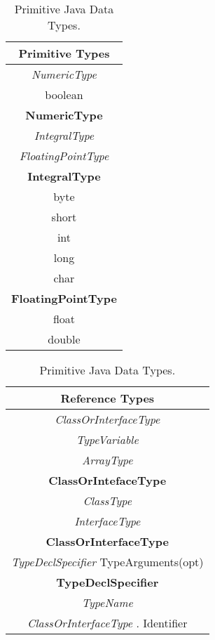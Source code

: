 \begin{table}
\parbox{.45\linewidth}{
\centering
    \begin{tabular}{c}
    \hline
     \textbf{Primitive Types}   \\ \hline
    \textit{NumericType}       \\
    boolean           \\ \hline
     \textbf{NumericType }      \\ \hline
     \textit{IntegralType}      \\
     \textit{FloatingPointType} \\ \hline
     \textbf{IntegralType}      \\ \hline
    byte              \\
    short             \\
    int               \\
    long              \\
    char              \\ \hline
     \textbf{FloatingPointType} \\ \hline
    float             \\
    double            \\
    \end{tabular}
        \caption{Primitive Java Data Types.}
        \label{tab:PrimitivesJava}
}
\parbox{.45\linewidth}{
    \begin{tabular}{c}
    \hline
    \textbf{Reference Types}                      \\ \hline
    \textit{ClassOrInterfaceType }                \\
    \textit{TypeVariable }                        \\
    \textit{ArrayType}                            \\ \hline
    \textbf{ClassOrIntefaceType}                  \\ \hline
    \textit{ClassType}                            \\
    \textit{InterfaceType }                       \\ \hline
    \textbf{ClassOrInterfaceType}                 \\ \hline
    \textit{TypeDeclSpecifier} TypeArguments(opt) \\ \hline
    \textbf{TypeDeclSpecifier}                    \\ \hline
    \textit{TypeName}                             \\
    \textit{ClassOrInterfaceType} . Identifier    \\ \hline

\end{tabular}}
\end{table}
